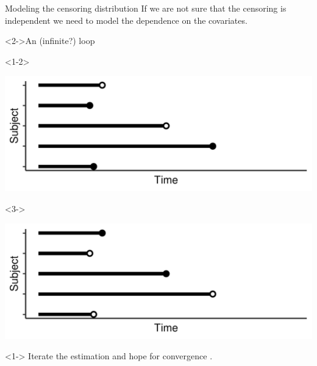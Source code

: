 \documentclass[smaller]{beamer}\usepackage{listings}
\begin{document}
\begin{frame}[label={sec:org5f2a1b0}]{Modeling the censoring distribution}
\small If we are not sure that the censoring is independent we need to model the dependence on the
covariates. \vfill


\begin{block}<2->{\centering An (infinite?) loop}
\begin{onlyenv}<1-2>
\pause

\begin{center}
\includegraphics[width=.9\linewidth]{./fig-obs-data.pdf}
\end{center}
\end{onlyenv}

\begin{onlyenv}<3->
\begin{center}
\includegraphics[width=.9\linewidth]{./fig-inverse-data.pdf}
\end{center}
\end{onlyenv}
\end{block}


\begin{onlyenv}<1->
\pause \pause Iterate the estimation and hope for convergence
\citep{han2021inverse,westling2021inference}.
\end{onlyenv}
\end{frame}
\end{document}
